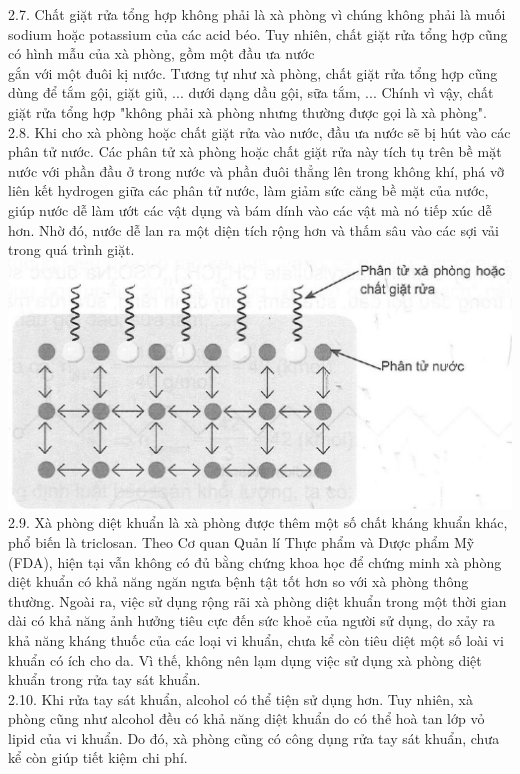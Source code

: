 \documentclass[10pt]{article}
\begin{document}
2.7. Chất giặt rửa tổng hợp không phải là xà phòng vì chúng không phải là muối sodium hoặc potassium của các acid béo. Tuy nhiên, chất giặt rửa tổng hợp cũng có hình mẫu của xà phòng, gồm một đầu ưa nước\\
gắn với một đuôi kị nước. Tương tự như xà phòng, chất giặt rửa tổng hợp cũng dùng để tắm gội, giặt giũ, ... dưới dạng dầu gội, sữa tắm, ... Chính vì vậy, chất giặt rửa tổng hợp "không phải xà phòng nhưng thường được gọi là xà phòng".\\
2.8. Khi cho xà phòng hoặc chất giặt rửa vào nước, đầu ưa nước sẽ bị hút vào các phân tử nước. Các phân tử xà phòng hoặc chất giặt rửa này tích tụ trên bề mặt nước với phần đầu ở trong nước và phần đuôi thẳng lên trong không khí, phá vỡ liên kết hydrogen giữa các phân tử nước, làm giảm sức căng bề mặt của nước, giúp nước dễ làm ướt các vật dụng và bám dính vào các vật mà nó tiếp xúc dễ hơn. Nhờ đó, nước dễ lan ra một diện tích rộng hơn và thấm sâu vào các sợi vải trong quá trình giặt.\\
\includegraphics[max width=\textwidth, center]{2025_10_23_b4e16b74380d0f7e7700g-008}\\
2.9. Xà phòng diệt khuẩn là xà phòng được thêm một số chất kháng khuẩn khác, phổ biến là triclosan. Theo Cơ quan Quản lí Thực phẩm và Dược phẩm Mỹ (FDA), hiện tại vẫn không có đủ bằng chứng khoa học để chứng minh xà phòng diệt khuẩn có khả năng ngăn ngưa bệnh tật tốt hơn so với xà phòng thông thường. Ngoài ra, việc sử dụng rộng rãi xà phòng diệt khuẩn trong một thời gian dài có khả năng ảnh hưởng tiêu cực đến sức khoẻ của người sử dụng, do xảy ra khả năng kháng thuốc của các loại vi khuẩn, chưa kể còn tiêu diệt một số loài vi khuẩn có ích cho da. Vì thế, không nên lạm dụng việc sử dụng xà phòng diệt khuẩn trong rửa tay sát khuẩn.\\
2.10. Khi rửa tay sát khuẩn, alcohol có thể tiện sử dụng hơn. Tuy nhiên, xà phòng cũng như alcohol đều có khả năng diệt khuẩn do có thể hoà tan lớp vỏ lipid của vi khuẩn. Do đó, xà phòng cũng có công dụng rửa tay sát khuẩn, chưa kể còn giúp tiết kiệm chi phí.\\
\end{document}

